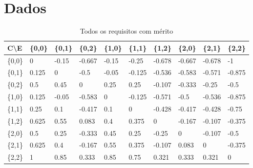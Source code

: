 \documentclass[preprint,12pt]{elsarticle}
\begin{document}
 


\appendix
\section{Dados}
\begin{table}[h]
\caption{Todos os requisitos com mérito}
\label{table:merit-1-all}
\centering
\begin{tabular}{@{}llllllllll@{}}
\toprule
C\textbackslash E & \{0,0\} & \{0,1\} & \{0,2\} & \{1,0\} & \{1,1\} & \{1,2\} & \{2,0\} & \{2,1\} & \{2,2\} \\ \midrule
\{0,0\} & 0 & -0.15 & -0.667 & -0.15 & -0.25 & -0.678 & -0.667 & -0.678 & -1 \\
\{0,1\} & 0.125 & 0 & -0.5 & -0.05 & -0.125 & -0.536 & -0.583 & -0.571 & -0.875 \\
\{0,2\} & 0.5 & 0.45 & 0 & 0.25 & 0.25 & -0.107 & -0.333 & -0.25 & -0.5 \\
\{1,0\} & 0.125 & -0.05 & -0.583 & 0 & -0.125 & -0.571 & -0.5 & -0.536 & -0.875 \\
\{1,1\} & 0.25 & 0.1 & -0.417 & 0.1 & 0 & -0.428 & -0.417 & -0.428 & -0.75 \\
\{1,2\} & 0.625 & 0.55 & 0.083 & 0.4 & 0.375 & 0 & -0.167 & -0.107 & -0.375 \\
\{2,0\} & 0.5 & 0.25 & -0.333 & 0.45 & 0.25 & -0.25 & 0 & -0.107 & -0.5 \\
\{2,1\} & 0.625 & 0.4 & -0.167 & 0.55 & 0.375 & -0.107 & 0.083 & 0 & -0.375 \\
\{2,2\} & 1 & 0.85 & 0.333 & 0.85 & 0.75 & 0.321 & 0.333 & 0.321 & 0 \\
\bottomrule
\end{tabular}


\end{table}
\end{document}
